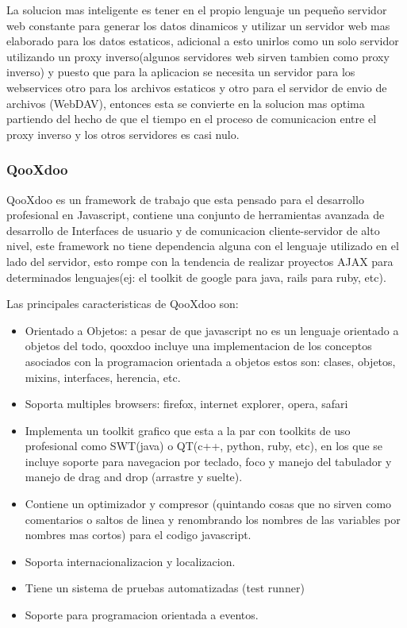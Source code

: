 La solucion mas inteligente es tener en el propio lenguaje un pequeño servidor web constante para generar los datos dinamicos y utilizar un servidor web mas elaborado para los datos estaticos, adicional a esto unirlos como un solo servidor utilizando un proxy inverso(algunos servidores web sirven tambien como proxy inverso) y puesto que para la aplicacion se necesita un servidor para los webservices otro para los archivos estaticos y otro para el servidor de envio de archivos (WebDAV), entonces esta se convierte en la solucion mas optima partiendo del hecho de que el tiempo en el proceso de comunicacion entre el proxy inverso y los otros servidores es casi nulo.


\subsubsection*{QooXdoo \cite{qooxdoo} }

QooXdoo es un framework de trabajo que esta pensado para el desarrollo profesional en Javascript, contiene una conjunto de herramientas avanzada de desarrollo de Interfaces de usuario y de comunicacion cliente-servidor de alto nivel, este framework no tiene dependencia alguna con el lenguaje utilizado en el lado del servidor, esto rompe con la tendencia de realizar proyectos AJAX para determinados lenguajes(ej: el toolkit de google para java, rails para ruby, etc).

Las principales caracteristicas de QooXdoo son:

\begin{itemize}

	\item Orientado a Objetos: a pesar de que javascript no es un lenguaje orientado a objetos del todo, qooxdoo incluye una implementacion de los conceptos asociados con la programacion orientada a objetos estos son: clases, objetos, mixins, interfaces, herencia, etc.
	
	\item Soporta multiples browsers: firefox, internet explorer, opera, safari
	\item Implementa un toolkit grafico que esta a la par con toolkits de uso profesional como SWT(java) o QT(c++, python, ruby, etc), en los que se incluye soporte para navegacion por teclado, foco y manejo del tabulador y manejo de drag and drop (arrastre y suelte).
	\item Contiene un optimizador y compresor (quintando cosas que no sirven como comentarios o saltos de linea y renombrando los nombres de las variables por nombres mas cortos) para el codigo javascript.
	\item Soporta internacionalizacion y localizacion.
	\item Tiene un sistema de pruebas automatizadas (test runner)
	\item Soporte para programacion orientada a eventos.

\end{itemize}


